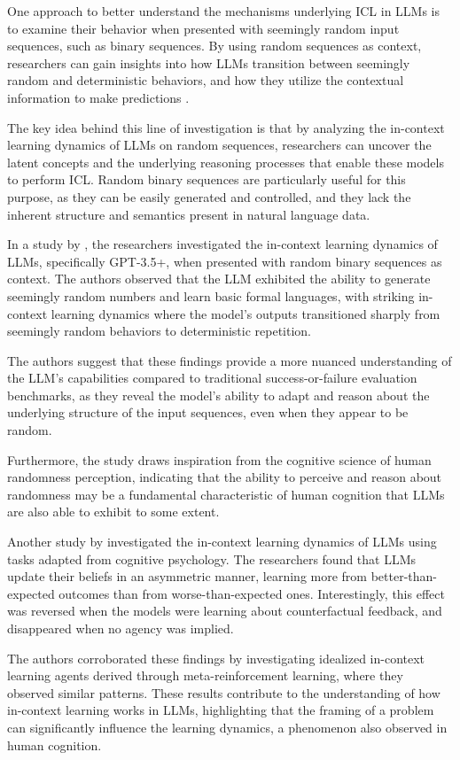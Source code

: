 \documentclass[11pt]{article}
\begin{document}
One approach to better understand the mechanisms underlying ICL in LLMs is to examine their behavior when presented with seemingly random input sequences, such as binary sequences. By using random sequences as context, researchers can gain insights into how LLMs transition between seemingly random and deterministic behaviors, and how they utilize the contextual information to make predictions \cite{ref194}.

The key idea behind this line of investigation is that by analyzing the in-context learning dynamics of LLMs on random sequences, researchers can uncover the latent concepts and the underlying reasoning processes that enable these models to perform ICL. Random binary sequences are particularly useful for this purpose, as they can be easily generated and controlled, and they lack the inherent structure and semantics present in natural language data.

In a study by \cite{ref194}, the researchers investigated the in-context learning dynamics of LLMs, specifically GPT-3.5+, when presented with random binary sequences as context. The authors observed that the LLM exhibited the ability to generate seemingly random numbers and learn basic formal languages, with striking in-context learning dynamics where the model's outputs transitioned sharply from seemingly random behaviors to deterministic repetition.

The authors suggest that these findings provide a more nuanced understanding of the LLM's capabilities compared to traditional success-or-failure evaluation benchmarks, as they reveal the model's ability to adapt and reason about the underlying structure of the input sequences, even when they appear to be random.

Furthermore, the study draws inspiration from the cognitive science of human randomness perception, indicating that the ability to perceive and reason about randomness may be a fundamental characteristic of human cognition that LLMs are also able to exhibit to some extent.

Another study by \cite{ref201} investigated the in-context learning dynamics of LLMs using tasks adapted from cognitive psychology. The researchers found that LLMs update their beliefs in an asymmetric manner, learning more from better-than-expected outcomes than from worse-than-expected ones. Interestingly, this effect was reversed when the models were learning about counterfactual feedback, and disappeared when no agency was implied.

The authors corroborated these findings by investigating idealized in-context learning agents derived through meta-reinforcement learning, where they observed similar patterns. These results contribute to the understanding of how in-context learning works in LLMs, highlighting that the framing of a problem can significantly influence the learning dynamics, a phenomenon also observed in human cognition.
\end{document}
